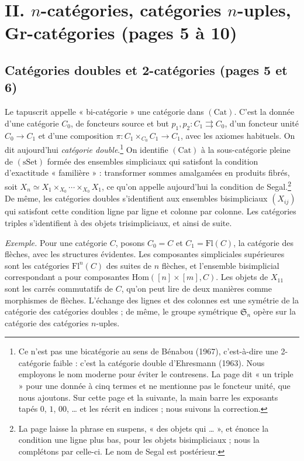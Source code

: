 \documentclass[11pt,a4paper]{article}
\begin{document}
\section*{II. $n$-catégories, catégories $n$-uples, Gr-catégories (pages 5 à 10)}

\subsection*{Catégories doubles et 2-catégories (pages 5 et 6)}

Le tapuscrit appelle « bi-catégorie » une catégorie dans $(\mathrm{Cat})$.
C'est la donnée d'une catégorie $C_0$, de foncteurs source et but $p_1, p_2 :
C_1 \rightrightarrows C_0$, d'un foncteur unité $C_0 \to C_1$ et d'une
composition $\pi : C_1 \times_{C_0} C_1 \to C_1$, avec les axiomes habituels.
On dit aujourd'hui \emph{catégorie double}.\footnote{Ce n'est pas une
bicatégorie au sens de Bénabou (1967), c'est-à-dire une 2-catégorie faible :
c'est la catégorie double d'Ehresmann (1963). Nous employons le nom moderne
pour éviter le contresens. La page dit « un triple » pour une donnée à cinq
termes et ne mentionne pas le foncteur unité, que nous ajoutons. Sur cette
page et la suivante, la main barre les exposants tapés $0$, $1$, $00$, …
et les récrit en indices ; nous suivons la correction.} On identifie
$(\mathrm{Cat})$ à la sous-catégorie pleine de $(\mathrm{sSet})$ formée des
ensembles simpliciaux qui satisfont la condition d'exactitude « familière » :
transformer sommes amalgamées en produits fibrés, soit $X_n \simeq X_1
\times_{X_0} \cdots \times_{X_0} X_1$, ce qu'on appelle aujourd'hui la
condition de Segal.\footnote{La page laisse la phrase en suspens, « des objets
qui … », et énonce la condition une ligne plus bas, pour les objets
bisimpliciaux ; nous la complétons par celle-ci. Le nom de Segal est
postérieur.} De même, les catégories doubles s'identifient aux ensembles
bisimpliciaux $(X_{ij})$ qui satisfont cette condition ligne par ligne et
colonne par colonne. Les catégories triples s'identifient à des objets
trisimpliciaux, et ainsi de suite.

\emph{Exemple.} Pour une catégorie $C$, posons $C_0 = C$ et $C_1 =
\mathrm{Fl}(C)$, la catégorie des flèches, avec les structures évidentes. Les
composantes simpliciales supérieures sont les catégories $\mathrm{Fl}^{n}(C)$
des suites de $n$ flèches, et l'ensemble bisimplicial correspondant a pour
composantes $\mathrm{Hom}([n] \times [m], C)$. Les objets de $X_{11}$ sont les
carrés commutatifs de $C$, qu'on peut lire de deux manières comme morphismes de
flèches. L'échange des lignes et des colonnes est une symétrie de la catégorie
des catégories doubles ; de même, le groupe symétrique $\mathfrak{S}_n$ opère
sur la catégorie des catégories $n$-uples.
\end{document}
